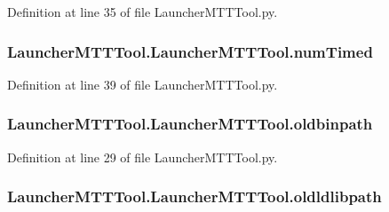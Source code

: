 Definition at line 35 of file Launcher\-M\-T\-T\-Tool.\-py.

\hypertarget{class_launcher_m_t_t_tool_1_1_launcher_m_t_t_tool_ae2be62c3d068b4c1c3d7c1ddaf4cfdbe}{
\subsubsection[{num\-Timed}]{\setlength{\rightskip}{0pt plus 5cm}Launcher\-M\-T\-T\-Tool.\-Launcher\-M\-T\-T\-Tool.\-num\-Timed}}\label{class_launcher_m_t_t_tool_1_1_launcher_m_t_t_tool_ae2be62c3d068b4c1c3d7c1ddaf4cfdbe}


Definition at line 39 of file Launcher\-M\-T\-T\-Tool.\-py.

\hypertarget{class_launcher_m_t_t_tool_1_1_launcher_m_t_t_tool_acf34764e2b173537cbf5720cc0a1235d}{
\subsubsection[{oldbinpath}]{\setlength{\rightskip}{0pt plus 5cm}Launcher\-M\-T\-T\-Tool.\-Launcher\-M\-T\-T\-Tool.\-oldbinpath}}\label{class_launcher_m_t_t_tool_1_1_launcher_m_t_t_tool_acf34764e2b173537cbf5720cc0a1235d}


Definition at line 29 of file Launcher\-M\-T\-T\-Tool.\-py.

\hypertarget{class_launcher_m_t_t_tool_1_1_launcher_m_t_t_tool_abb2e78c53544b045ef3ab42ed8b68806}{
\subsubsection[{oldldlibpath}]{\setlength{\rightskip}{0pt plus 5cm}Launcher\-M\-T\-T\-Tool.\-Launcher\-M\-T\-T\-Tool.\-oldldlibpath}}\label{class_launcher_m_t_t_tool_1_1_launcher_m_t_t_tool_abb2e78c53544b045ef3ab42ed8b68806}



